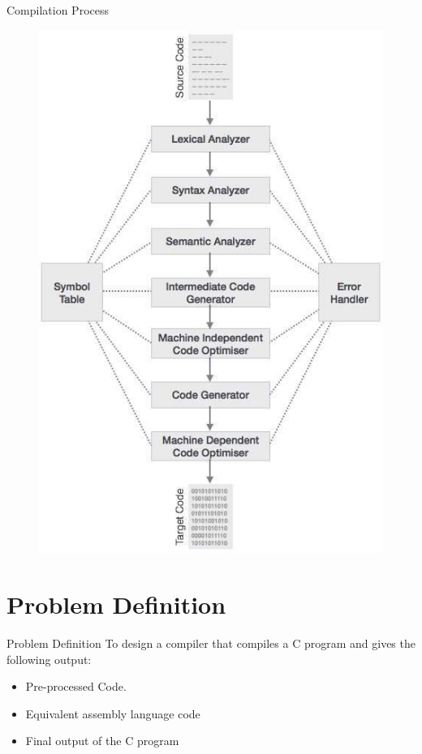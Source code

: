 \documentclass[dvipsnames]{beamer}
\begin{document}
\begin{frame}{Compilation Process}
\begin{figure}
	\includegraphics[scale=0.33]{2}
\end{figure}
\end{frame}

\section{Problem Definition}
\begin{frame}{Problem Definition}
To design a compiler that compiles a C program and gives the following output:
\begin{itemize}
\item Pre-processed Code.
\item Equivalent assembly language code
\item Final output of the C program
\end{itemize}
\end{frame}
\end{document}
